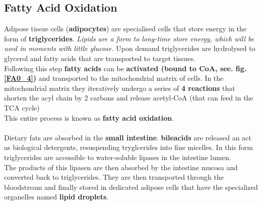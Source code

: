 \documentclass[../main.tex]{subfiles}
\begin{document}
\subsection{Fatty Acid Oxidation}
Adipose tissue cells (\textbf{adipocytes}) are specialised cells that store energy in the form of \textbf{triglycerides}. \textit{Lipids are a form to long-time store energy, which will be used in moments with little glucose.} Upon demand triglycerides are hydrolysed to glycerol and fatty acids that are transported to target tissues. \\
Following this step \textbf{fatty acids} can be \textbf{activated (bound to CoA, see. fig. \ref{FA0_4})} and transported to the mitochondrial matrix of cells. In the mitochondrial matrix they iteratively undergo a series of \textbf{4 reactions} that shorten the acyl chain by 2 carbons and release acetyl-CoA (that can feed in the TCA cycle)\\
This entire process is known as \textbf{fatty acid oxidation}. \\
\\
Dietary fats are absorbed in the \textbf{small intestine}. \textbf{\gls{bileacids}} are released an act as biological detergents, resuspending tryglcerides into fine micelles. In this form triglycerides are accessible to water-soluble lipases in the intestine lumen. \\
The products of this lipasen are then absorbed by the intestine mucosa and converted back to triglycerides. They are then transported through the bloodstream and finally stored in dedicated adipose cells that have the specialized organelles named \textbf{lipid droplets}.
\end{document}
